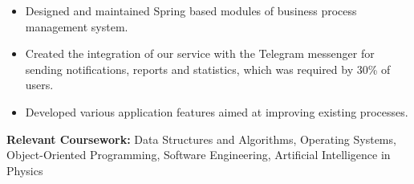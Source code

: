 \documentclass[12pt,a4paper,ragged2e,withhyper]{altacv}
\begin{document}
\divider
\smallskip

\begin{itemize}
    \item Designed and maintained Spring based modules of business process management system.
    \item Created the integration of our service with the Telegram messenger for sending notifications, reports and statistics, which was required by 30\% of users.
    \item Developed various application features aimed at improving existing processes.
\end{itemize}

\medskip



\textbf{Relevant Coursework:} Data Structures and Algorithms, Operating Systems, Object-Oriented Programming, Software Engineering, Artificial Intelligence in Physics
\end{document}

